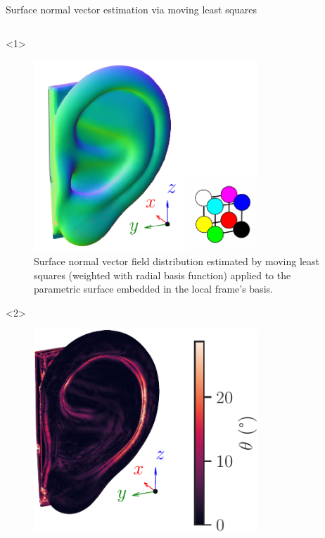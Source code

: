 \documentclass[xcolor=dvipsnames,10pt]{beamer}
\begin{document}
\begin{frame}{Surface normal vector estimation via moving least squares}
    \begin{columns}[c]
        \begin{column}{0.5\textwidth}
            \begin{onlyenv}<1>
                \begin{center}
                \begin{figure}
                    \includegraphics[width=0.75\textwidth]{figures/ear_surf_n.pca.pdf}
                    \caption{Surface normal vector field distribution estimated by moving least squares (weighted with radial basis function) applied to the parametric surface embedded in the local frame's basis.}
                \end{figure}
                \end{center}
            \end{onlyenv}
            \begin{onlyenv}<2>
                \begin{center}
                \begin{figure}
                    \includegraphics[width=0.75\textwidth]{figures/ear_error_dist.pdf}

\end{figure}
\end{center}
\end{onlyenv}
\end{column}
\end{columns}
\end{frame}
\end{document}
